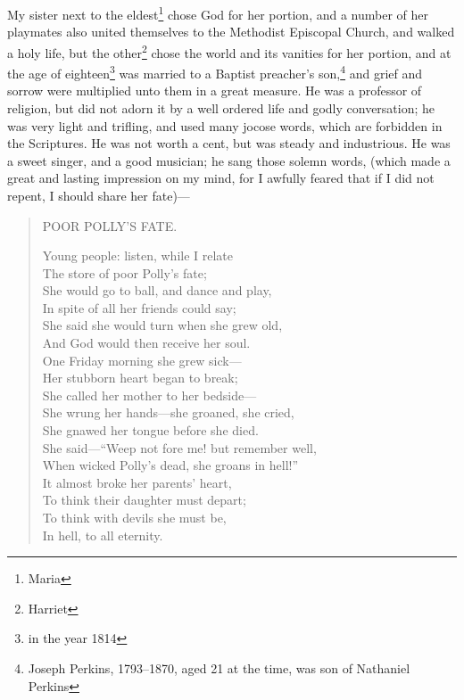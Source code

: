 My sister next to the eldest\footnote{Maria} chose God for her portion, and a number of her playmates also united themselves to the Methodist Episcopal Church, and walked a holy life, but the other\footnote{Harriet} chose the world and its vanities for her portion, and at the age of eighteen\footnote{in the year 1814} was married to a Baptist preacher's son,\footnote{Joseph Perkins, 1793--1870, aged 21 at the time, was son of Nathaniel Perkins} and grief and sorrow were multiplied unto them in a great measure.
He was a professor of religion, but did not adorn it by a well ordered life and godly conversation; he was very light and trifling, and used many jocose words, which are forbidden in the Scriptures.
He was not worth a cent, but was steady and industrious.
He was a sweet singer, and a good musician; he sang those solemn words, (which made a great and lasting impression on my mind, for I awfully feared that if I did not repent, I should share her fate)---
\begin{quote}
    \begin{center}
        POOR POLLY'S FATE.
    \end{center}
    Young people: listen, while I relate\\
    The store of poor Polly's fate;\\
    She would go to ball, and dance and play,\\
    In spite of all her friends could say;\\
    She said she would turn when she grew old,\\
    And God would then receive her soul.\\
    One Friday morning she grew sick---\\
    Her stubborn heart began to break;\\
    She called her mother to her bedside---\\
    She wrung her hands---she groaned, she cried,\\
    She gnawed her tongue before she died.\\
    She said---``Weep not fore me! but remember well,\\
    When wicked Polly's dead, she groans in hell!''\\
    It almost broke her parents' heart,\\
    To think their daughter must depart;\\
    To think with devils she must be,\\
    In hell, to all eternity.\\
\end{quote}

